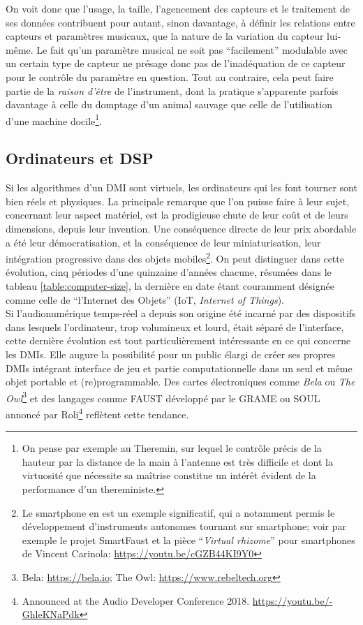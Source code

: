 \indent On voit donc que l'usage, la taille, l'agencement des capteurs et le traitement de ses données contribuent pour autant, sinon davantage, à définir les relations entre capteurs et paramètres musicaux, que la nature de la variation du capteur lui-même. Le fait qu'un paramètre musical ne soit pas ``facilement'' modulable avec un certain type de capteur ne présage donc pas de l'inadéquation de ce capteur pour le contrôle du paramètre en question. Tout au contraire, cela peut faire partie de la \textit{raison d'être} de l'instrument, dont la pratique s'apparente parfois davantage à celle du domptage d'un animal sauvage que celle de l'utilisation d'une machine docile\footnote{On pense par exemple au Theremin, sur lequel le contrôle précis de la hauteur par la distance de la main à l'antenne est très difficile et dont la virtuosité que nécessite sa maîtrise constitue un intérêt évident de la performance d'un thereministe.}.


\subsection{Ordinateurs et DSP}
\label{sec:interfaces:computers_and_dsp}

\noindent Si les algorithmes d'un \gls{DMI} sont virtuels, les ordinateurs qui les font tourner sont bien réels et physiques. La principale remarque que l'on puisse faire à leur sujet, concernant leur aspect matériel, est la prodigieuse chute de leur coût et de leurs dimensions, depuis leur invention. Une conséquence directe de leur prix abordable a été leur démocratisation, et la conséquence de leur miniaturisation, leur intégration progressive dans des objets mobiles\footnote{Le smartphone en est un exemple significatif, qui a notamment permis le développement d'instruments autonomes tournant sur smartphone; voir par exemple le projet SmartFaust et la pièce ``\textit{Virtual rhizome}'' pour smartphones de Vincent Carinola: \url{https://youtu.be/cGZB44KI9Y0}}. On peut distinguer dans cette évolution, cinq périodes d'une quinzaine d'années chacune, résumées dans le tableau \ref{table:computer-size}, la dernière en date étant couramment désignée comme celle de ``l'Internet des Objets'' (IoT, \textit{Internet of Things}).\\
\indent Si l'audionumérique temps-réel a depuis son origine été incarné par des dispositifs dans lesquels l'ordinateur, trop volumineux et lourd, était séparé de l'interface, cette dernière évolution est tout particulièrement intéressante en ce qui concerne les \glspl{DMI}. Elle augure la possibilité pour un public élargi de créer ses propres \glspl{DMI} intégrant interface de jeu et partie computationnelle dans un seul et même objet portable et (re)programmable. Des cartes électroniques comme \textit{Bela} ou \textit{The Owl}\footnote{Bela: \url{https://bela.io}; The Owl: \url{https://www.rebeltech.org}} et des langages comme \gls{FAUST} développé par le \gls{GRAME} \cite{orlarey_faust_2008} ou SOUL annoncé par Roli\footnote{Announced at the Audio Developer Conference 2018. \url{https://youtu.be/-GhleKNaPdk}} reflètent cette tendance.

